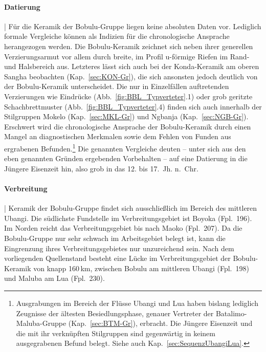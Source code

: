 \paragraph{Datierung}\hspace{-.5em}|\hspace{.5em}%
Für die Keramik der Bobulu-Gruppe liegen keine absoluten Daten vor. Lediglich formale Vergleiche können als Indizien für die chronologische Ansprache herangezogen werden. Die Bobulu-Keramik zeichnet sich neben ihrer generellen Verzierungsarmut vor allem durch breite, im Profil u-förmige Riefen im Rand- und Halsbereich aus. Letzteres lässt sich auch bei der Konda-Keramik am oberen \mbox{Sangha} beobachten (Kap.~\ref{sec:KON-Gr}), die sich ansonsten jedoch deutlich von der Bobulu-Keramik unterscheidet. Die nur in Einzelfällen auftretenden Verzierungen wie Eindrücke (Abb.~\ref{fig:BBL_Typverteter}.1) oder grob geritzte Schachbrettmuster (Abb.~\ref{fig:BBL_Typverteter}.4) finden sich auch innerhalb der Stilgruppen Mokelo (Kap.~\ref{sec:MKL-Gr}) und \mbox{Ngbanja} (Kap.~\ref{sec:NGB-Gr}). Erschwert wird die chronologische Ansprache der Bobulu-Keramik durch einen Mangel an diagnostischen Merkmalen sowie dem Fehlen von Funden aus ergrabenen Befunden.\footnote{Ausgrabungen im Bereich der Flüsse \mbox{Ubangi} und Lua haben bislang lediglich Zeugnisse der ältesten Besiedlungsphase, genauer Vertreter der Batalimo-Maluba-Gruppe (Kap.~\ref{sec:BTM-Gr}), erbracht. Die Jüngere Eisenzeit und die mit ihr verknüpften Stilgruppen sind gegenwärtig in keinem ausgegrabenen Befund belegt. Siehe auch Kap.~\ref{sec:SequenzUbangiLua}.} Die genannten Vergleiche deuten -- unter sich aus den eben genannten Gründen ergebenden Vorbehalten -- auf eine Datierung in die Jüngere Eisenzeit hin, also grob in das 12. bis 17.~Jh. n.~Chr.


\paragraph{Verbreitung}\hspace{-.5em}|\hspace{.5em}%
Keramik der Bobulu-Gruppe findet sich ausschließlich im Bereich des mittleren \mbox{Ubangi}. Die südlichste Fundstelle im Verbreitungsgebiet ist Boyoka (Fpl.~196). Im Norden reicht das Verbreitungsgebiet bis nach Maoko (Fpl.~207). Da die Bobulu-Gruppe nur sehr schwach im Arbeitsgebiet belegt ist, kann die Eingrenzung ihres Verbreitungsgebietes nur unzureichend sein. Nach dem vorliegenden Quellenstand besteht eine Lücke im Verbreitungsgebiet der Bobulu-Keramik von knapp 160\,km, zwischen Bobulu am mittleren \mbox{Ubangi} (Fpl.~198) und Maluba am Lua (Fpl.~230).